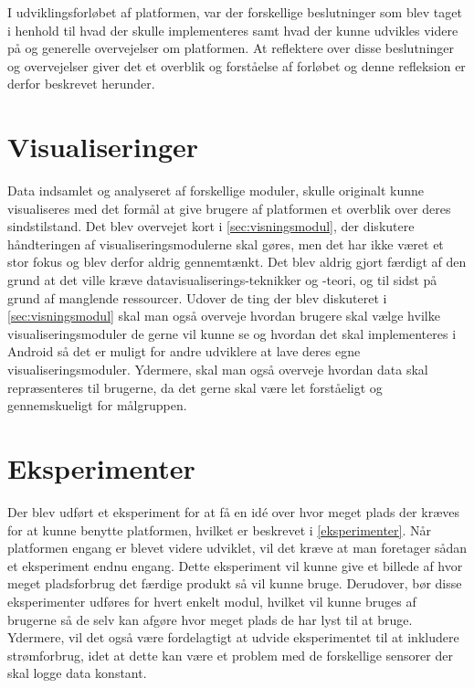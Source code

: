I udviklingsforløbet af platformen, var der forskellige beslutninger som blev taget i henhold til hvad der skulle implementeres samt hvad der kunne udvikles videre på og generelle overvejelser om platformen.
At reflektere over disse beslutninger og overvejelser giver det et overblik og forståelse af forløbet og denne refleksion er derfor beskrevet herunder. 


\section{Visualiseringer}
Data indsamlet og analyseret af forskellige moduler, skulle originalt kunne visualiseres med det formål at give brugere af platformen et overblik over deres sindstilstand.
Det blev overvejet kort i \cref{sec:visningsmodul}, der diskutere håndteringen af visualiseringsmodulerne skal gøres, men det har ikke været et stor fokus og blev derfor aldrig gennemtænkt. 
Det blev aldrig gjort færdigt af den grund at det ville kræve datavisualiserings-teknikker og -teori, og til sidst på grund af manglende ressourcer. 
Udover de ting der blev diskuteret i \cref{sec:visningsmodul} skal man også overveje hvordan brugere skal vælge hvilke visualiseringsmoduler de gerne vil kunne se og hvordan det skal implementeres i Android så det er muligt for andre udviklere at lave deres egne visualiseringsmoduler.
Ydermere, skal man også overveje hvordan data skal repræsenteres til brugerne, da det gerne skal være let forståeligt og gennemskueligt for målgruppen. 

\section{Eksperimenter}
Der blev udført et eksperiment for at få en idé over hvor meget plads der kræves for at kunne benytte platformen, hvilket er beskrevet i \cref{eksperimenter}.
Når platformen engang er blevet videre udviklet, vil det kræve at man foretager sådan et eksperiment endnu engang. 
Dette eksperiment vil kunne give et billede af hvor meget pladsforbrug det færdige produkt så vil kunne bruge.
Derudover, bør disse eksperimenter udføres for hvert enkelt modul, hvilket vil kunne bruges af brugerne så de selv kan afgøre hvor meget plads de har lyst til at bruge.
Ydermere, vil det også være fordelagtigt at udvide eksperimentet til at inkludere strømforbrug, idet at dette kan være et problem med de forskellige sensorer der skal logge data konstant.

